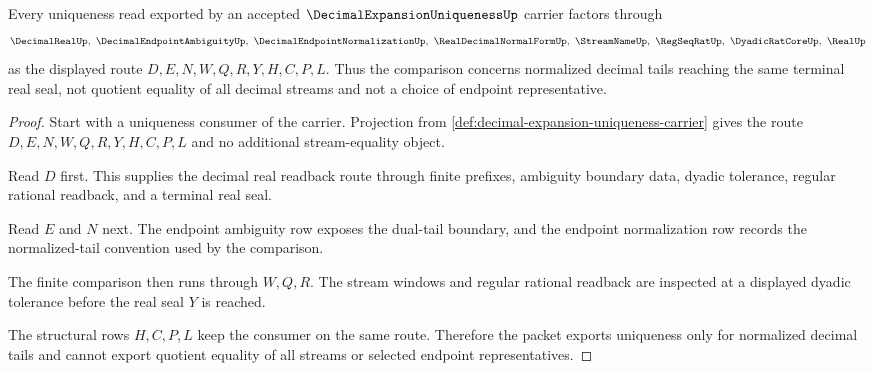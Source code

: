 \begin{theorem}
\label{thm:decimal-expansion-uniqueness-normal-form-route}
Every uniqueness read exported by an accepted $\DecimalExpansionUniquenessUp$ carrier factors through
$$
\DecimalRealUp,\ \DecimalEndpointAmbiguityUp,\ \DecimalEndpointNormalizationUp,\ \RealDecimalNormalFormUp,\ \StreamNameUp,\ \RegSeqRatUp,\ \DyadicRatCoreUp,\ \RealUp
$$
as the displayed route $D,E,N,W,Q,R,Y,H,C,P,L$. Thus the comparison concerns normalized decimal tails reaching the same terminal real seal, not quotient equality of all decimal streams and not a choice of endpoint representative.
\end{theorem}
\begin{proof}
Start with a uniqueness consumer of the carrier. Projection from \autoref{def:decimal-expansion-uniqueness-carrier} gives the route $D,E,N,W,Q,R,Y,H,C,P,L$ and no additional stream-equality object.

Read $D$ first. This supplies the decimal real readback route through finite prefixes, ambiguity boundary data, dyadic tolerance, regular rational readback, and a terminal real seal.

Read $E$ and $N$ next. The endpoint ambiguity row exposes the dual-tail boundary, and the endpoint normalization row records the normalized-tail convention used by the comparison.

The finite comparison then runs through $W,Q,R$. The stream windows and regular rational readback are inspected at a displayed dyadic tolerance before the real seal $Y$ is reached.

The structural rows $H,C,P,L$ keep the consumer on the same route. Therefore the packet exports uniqueness only for normalized decimal tails and cannot export quotient equality of all streams or selected endpoint representatives.
\end{proof}


